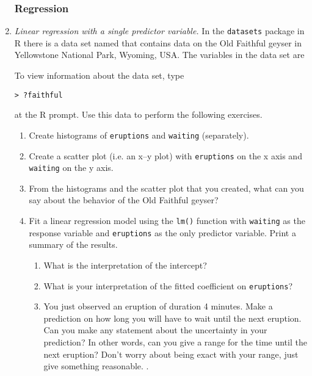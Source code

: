 \begin{enumerate}

\subsubsection*{Regression}
  
\item \emph{Linear regression with a single predictor variable.}
In the \texttt{datasets} package in R there is a data set named
 that
contains data on the Old Faithful geyser in Yellowstone National Park,
Wyoming, USA.  The variables in the data set are

To view information about the data set, type
\begin{Verbatim}
> ?faithful
\end{Verbatim}
at the R prompt. Use this data to perform the following exercises.

\begin{enumerate}
\item Create histograms of \texttt{eruptions} and \texttt{waiting}
  (separately). \label{hist}

\item Create a scatter plot (i.e. an x--y plot) with \texttt{eruptions}
  on the x axis and \texttt{waiting} on the y axis. \label{scat}

\item From the histograms and the scatter plot that you created, what
  can you say about the behavior of the Old Faithful geyser? \label{interp}
  
\item Fit a linear regression model using the \texttt{lm()} function
  with \texttt{waiting} as the response variable and \texttt{eruptions}
  as the only predictor variable. Print a summary of the results.
  \begin{enumerate}
  \item What is the interpretation of the intercept? \label{int}
  \item What is your interpretation of the fitted coefficient
    on \texttt{eruptions}? \label{dur}

  \item You just observed an eruption of duration 4 minutes.
    Make a prediction on how long you will have to wait until
    the next eruption. Can you make any statement about the
    uncertainty in your prediction? In other words, can
    you give a range for the time until the next eruption?
    Don't worry about being exact with your range, just
    give something reasonable. \label{pred}.
  \end{enumerate}
\end{enumerate}


\end{enumerate}
